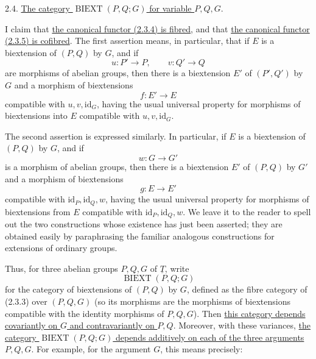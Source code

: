 
2.4. \underline{The category $\operatorname{BIEXT}(P,Q;G)$ for
variable $P,Q,G$}.

I claim that \underline{the canonical functor (2.3.4) is fibred}, and
that \underline{the canonical functor (2.3.5) is cofibred}. The first
assertion means, in particular, that if $E$ is a biextension of
$(P,Q)$ by $G$, and if
\[
 u:P'\longrightarrow P,\qquad v:Q'\longrightarrow Q
\]
are morphisms of abelian groups, then there is a biextension $E'$ of
$(P',Q')$ by $G$ and a morphism of biextensions
\[
 f:E'\longrightarrow E
\]
compatible with $u,v,\mathrm{id}_G$, having the usual universal
property for morphisms of biextensions into $E$ compatible with
$u,v,\mathrm{id}_G$.

The second assertion is expressed similarly. In particular, if $E$ is
a biextension of $(P,Q)$ by $G$, and if
\[
 w:G\longrightarrow G'
\]
is a morphism of abelian groups, then there is a biextension $E'$ of
$(P,Q)$ by $G'$ and a morphism of biextensions
\[
 g:E\longrightarrow E'
\]
compatible with $\mathrm{id}_P,\mathrm{id}_Q,w$, having the usual
universal property for morphisms of biextensions from $E$ compatible
with $\mathrm{id}_P,\mathrm{id}_Q,w$. We leave it to the reader to
spell out the two constructions whose existence has just been
asserted; they are obtained easily by paraphrasing the familiar
analogous constructions for extensions of ordinary groups.

Thus, for three abelian groups $P,Q,G$ of $\underline T$, write
\begin{equation}\tag{2.4.1}
 \operatorname{BIEXT}(P,Q;G)
\end{equation}
for the category of biextensions of $(P,Q)$ by $G$, defined as the
fibre category of (2.3.3) over $(P,Q,G)$ (so its morphisms are the
morphisms of biextensions compatible with the identity morphisms of
$P,Q,G$). Then \underline{this category depends covariantly on $G$ and
contravariantly on $P,Q$}. Moreover, with these variances,
\underline{the category $\operatorname{BIEXT}(P,Q;G)$ depends
additively on each of the three arguments $P,Q,G$}. For example, for
the argument $G$, this means precisely:

